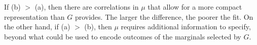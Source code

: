 \documentclass{article}
\theoremstyle{plain}
\theoremstyle{definition}
\theoremstyle{remark}
\numberwithin{equation}{section}
\begin{document}
If (b) $>$ (a), then there are correlations in $\mu$ that allow for a more
compact representation than $G$ provides.
The larger the difference, the poorer the fit.
On the other hand, if (a) $>$ (b), then
$\mu$ requires additional information to specify, beyond
what could be used to encode outcomes of the marginals selected by $G$.
\end{document}
